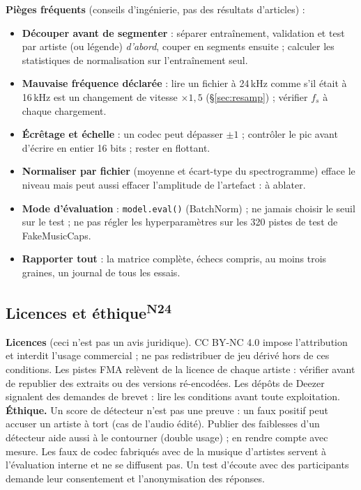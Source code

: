 \documentclass[10pt,a4paper]{article}
\newcommand{\nref}[1]{\textsuperscript{\scriptsize\textcolor{black!55}{#1}}}
\begin{document}
\textbf{Pièges fréquents} (conseils d'ingénierie, pas des résultats d'articles) :
\begin{itemize}
  \item \textbf{Découper avant de segmenter} : séparer entraînement, validation et test par artiste (ou légende) \emph{d'abord}, couper en segments ensuite ; calculer les statistiques de normalisation sur l'entraînement seul.
  \item \textbf{Mauvaise fréquence déclarée} : lire un fichier à 24\,kHz comme s'il était à 16\,kHz est un changement de vitesse $\times1{,}5$ (§\ref{sec:resamp}) ; vérifier $f_s$ à chaque chargement.
  \item \textbf{Écrêtage et échelle} : un codec peut dépasser $\pm1$ ; contrôler le pic avant d'écrire en entier 16 bits ; rester en flottant.
  \item \textbf{Normaliser par fichier} (moyenne et écart-type du spectrogramme) efface le niveau mais peut aussi effacer l'amplitude de l'artefact : à ablater.
  \item \textbf{Mode d'évaluation} : \texttt{model.eval()} (BatchNorm) ; ne jamais choisir le seuil sur le test ; ne pas régler les hyperparamètres sur les 320 pistes de test de FakeMusicCaps.
  \item \textbf{Rapporter tout} : la matrice complète, échecs compris, au moins trois graines, un journal de tous les essais.
\end{itemize}

\subsection{Licences et éthique\nref{N24}}
\textbf{Licences} (ceci n'est pas un avis juridique). CC BY-NC 4.0 impose l'attribution et interdit l'usage commercial ; ne pas redistribuer de jeu dérivé hors de ces conditions. Les pistes FMA relèvent de la licence de chaque artiste : vérifier avant de republier des extraits ou des versions ré-encodées. Les dépôts de Deezer signalent des demandes de brevet : lire les conditions avant toute exploitation. \textbf{Éthique.} Un score de détecteur n'est pas une preuve : un faux positif peut accuser un artiste à tort (cas de l'audio édité). Publier des faiblesses d'un détecteur aide aussi à le contourner (double usage) ; en rendre compte avec mesure. Les faux de codec fabriqués avec de la musique d'artistes servent à l'évaluation interne et ne se diffusent pas. Un test d'écoute avec des participants demande leur consentement et l'anonymisation des réponses.
\end{document}
